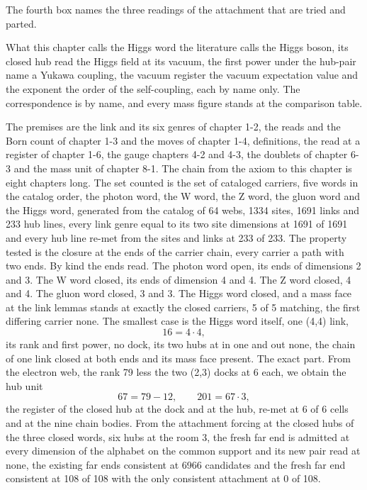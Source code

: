 The fourth box names the three readings of the attachment that are tried and parted.
\begin{chbridge}
What this chapter calls the Higgs word the literature calls the Higgs boson, its closed hub read the Higgs field at its vacuum, the first power under the hub-pair name a Yukawa coupling, the vacuum register the vacuum expectation value and the exponent the order of the self-coupling, each by name only. The correspondence is by name, and every mass figure stands at the comparison table.
\end{chbridge}
\begin{chproof}[census]
The premises are the link and its six genres of chapter 1-2, the reads and the Born count of chapter 1-3 and the moves of chapter 1-4, definitions, the read at a register of chapter 1-6, the gauge chapters 4-2 and 4-3, the doublets of chapter 6-3 and the mass unit of chapter 8-1. The chain from the axiom to this chapter is eight chapters long. The set counted is the set of cataloged carriers, five words in the catalog order, the photon word, the W word, the Z word, the gluon word and the Higgs word, generated from the catalog of 64 webs, 1334 sites, 1691 links and 233 hub lines, every link genre equal to its two site dimensions at 1691 of 1691 and every hub line re-met from the sites and links at 233 of 233. The property tested is the closure at the ends of the carrier chain, every carrier a path with two ends. By kind the ends read. The photon word open, its ends of dimensions 2 and 3. The W word closed, its ends of dimension 4 and 4. The Z word closed, 4 and 4. The gluon word closed, 3 and 3. The Higgs word closed, and a mass face at the link lemmas stands at exactly the closed carriers, 5 of 5 matching, the first differing carrier none. The smallest case is the Higgs word itself, one (4,4) link,
\begin{equation}
16 = 4 \cdot 4 ,
\end{equation}
its rank and first power, no dock, its two hubs at in one and out none, the chain of one link closed at both ends and its mass face present. The exact part. From the electron web, the rank 79 less the two (2,3) docks at 6 each, we obtain the hub unit
\begin{equation}
67 = 79 - 12, \qquad 201 = 67 \cdot 3 ,
\end{equation}
the register of the closed hub at the dock and at the hub, re-met at 6 of 6 cells and at the nine chain bodies. From the attachment forcing at the closed hubs of the three closed words, six hubs at the room 3, the fresh far end is admitted at every dimension of the alphabet on the common support and its new pair read at none, the existing far ends consistent at 6966 candidates and the fresh far end consistent at 108 of 108 with the only consistent attachment at 0 of 108.


\end{chproof}
